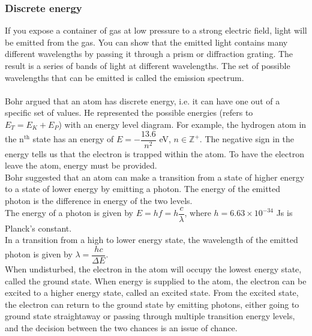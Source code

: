 \documentclass[a4paper,12pt]{article}
\begin{document}
\subsubsection*{Discrete energy}
If you expose a container of gas at low pressure to a strong electric field, light will be emitted from the gas. You can show that the emitted light contains many different wavelengths by passing it through a prism or diffraction grating. The result is a series of bands of light at different wavelengths. The set of possible wavelengths that can be emitted is called the emission spectrum.\\\\
Bohr argued that an atom has discrete energy, i.e. it can have one out of a specific set of values. He represented the possible energies (refers to $E_T=E_K+E_P$) with an energy level diagram. For example, the hydrogen atom in the n$^\text{th}$ state has an energy of $E=-\dfrac{13.6}{n^2}$ eV, $n\in \mathbb{Z^+}$. The negative sign in the energy tells us that the electron is trapped within the atom. To have the electron leave the atom, energy must be provided.\\
Bohr suggested that an atom can make a transition from a state of higher energy to a state of lower energy by emitting a photon. The energy of the emitted photon is the difference in energy of the two levels. \\
The energy of a photon is given by $E=hf=h\dfrac{c}{\lambda}$, where $h=6.63\times 10^{-34}$ Js is Planck's constant.\\
In a transition from a high to lower energy state, the wavelength of the emitted photon is given by $\lambda=\dfrac{hc}{\Delta E}$.\\
When undisturbed, the electron in the atom will occupy the lowest energy state, called the ground state. When energy is supplied to the atom, the electron can be excited to a higher energy state, called an excited state. From the excited state, the electron can return to the ground state by emitting photons, either going to ground state straightaway or passing through multiple transition energy levels, and the decision between the two chances is an issue of chance.
\end{document}
